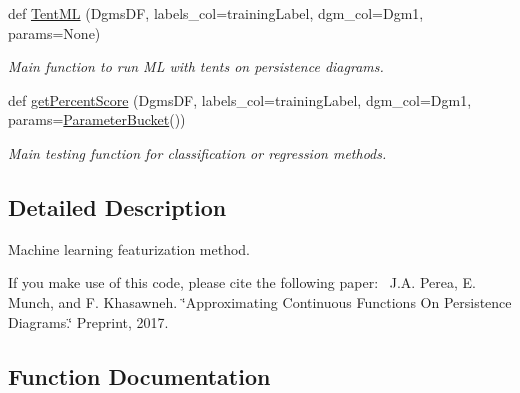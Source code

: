 \begin{DoxyCompactItemize}
\item 
def \hyperlink{namespaceteaspoon_1_1_m_l_1_1tents_aedb3c3fb1a8c0faa8bbe358db170f5bb}{Tent\+ML} (Dgms\+DF, labels\+\_\+col=\textquotesingle{}training\+Label\textquotesingle{}, dgm\+\_\+col=\textquotesingle{}Dgm1\textquotesingle{}, params=None)
\begin{DoxyCompactList}\small\item\em Main function to run ML with tents on persistence diagrams. \end{DoxyCompactList}\item 
def \hyperlink{namespaceteaspoon_1_1_m_l_1_1tents_a90cc7e8be9f3e13ef4528d1239fda660}{get\+Percent\+Score} (Dgms\+DF, labels\+\_\+col=\textquotesingle{}training\+Label\textquotesingle{}, dgm\+\_\+col=\textquotesingle{}Dgm1\textquotesingle{}, params=\hyperlink{classteaspoon_1_1_m_l_1_1tents_1_1_parameter_bucket}{Parameter\+Bucket}())
\begin{DoxyCompactList}\small\item\em Main testing function for classification or regression methods. \end{DoxyCompactList}\end{DoxyCompactItemize}


\subsection{Detailed Description}
Machine learning featurization method. 

If you make use of this code, please cite the following paper\+:~\newline
 J.\+A. Perea, E. Munch, and F. Khasawneh. \char`\"{}\+Approximating Continuous Functions On Persistence Diagrams.\char`\"{} Preprint, 2017. 

\subsection{Function Documentation}
